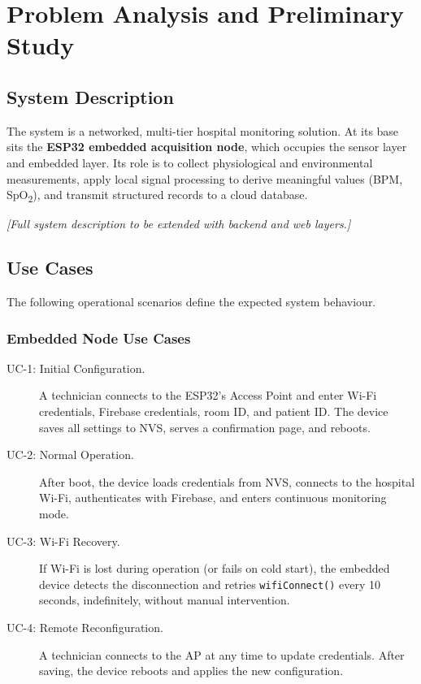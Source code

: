 \chapter{Problem Analysis and Preliminary Study}

\section{System Description}

The system is a networked, multi-tier hospital monitoring solution.
At its base sits the \textbf{ESP32 embedded acquisition node}, which occupies the
sensor layer and embedded layer. Its role is to collect physiological and environmental
measurements, apply local signal processing to derive meaningful values (BPM,
SpO\textsubscript{2}), and transmit structured records to a cloud database.

\begin{center}
	\textit{[Full system description to be extended with backend and web layers.]}
\end{center}

\section{Use Cases}

The following operational scenarios define the expected system behaviour.

\subsection*{Embedded Node Use Cases}

\begin{description}
	\item[UC-1: Initial Configuration.]
	      A technician connects to the ESP32's Access Point and enter Wi-Fi credentials, Firebase credentials, room ID, and patient ID. The device saves all settings to NVS, serves a confirmation page, and reboots.

	\item[UC-2: Normal Operation.]
	      After boot, the device loads credentials from NVS, connects to the hospital Wi-Fi,
	      authenticates with Firebase, and enters continuous monitoring mode.

	\item[UC-3: Wi-Fi Recovery.]
	      If Wi-Fi is lost during operation (or fails on cold start), the embedded device
	      detects the disconnection and retries \texttt{wifiConnect()} every 10 seconds,
	      indefinitely, without manual intervention.

	\item[UC-4: Remote Reconfiguration.]
	      A technician connects to the AP at any time to update credentials.
	      After saving, the device reboots and applies the new configuration.
\end{description}


